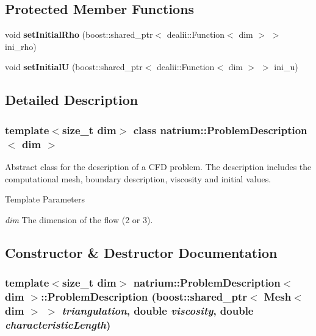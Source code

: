 \subsection*{Protected Member Functions}
\begin{DoxyCompactItemize}
\item 
\hypertarget{classnatrium_1_1ProblemDescription_a3b1f71cc4ec46691a29478049d851c8d}{
void {\bfseries setInitialRho} (boost::shared\_\-ptr$<$ dealii::Function$<$ dim $>$ $>$ ini\_\-rho)}
\label{classnatrium_1_1ProblemDescription_a3b1f71cc4ec46691a29478049d851c8d}

\item 
\hypertarget{classnatrium_1_1ProblemDescription_a1e173a98aaf7233b9b9e849b5d1f9efb}{
void {\bfseries setInitialU} (boost::shared\_\-ptr$<$ dealii::Function$<$ dim $>$ $>$ ini\_\-u)}
\label{classnatrium_1_1ProblemDescription_a1e173a98aaf7233b9b9e849b5d1f9efb}

\end{DoxyCompactItemize}


\subsection{Detailed Description}
\subsubsection*{template$<$size\_\-t dim$>$ class natrium::ProblemDescription$<$ dim $>$}

Abstract class for the description of a CFD problem. The description includes the computational mesh, boundary description, viscosity and initial values. 
\begin{DoxyTemplParams}{Template Parameters}
\item[{\em dim}]The dimension of the flow (2 or 3). \end{DoxyTemplParams}


\subsection{Constructor \& Destructor Documentation}
\hypertarget{classnatrium_1_1ProblemDescription_afc92659d0022799b4e846cf050e8efad}{
\subsubsection[{ProblemDescription}]{\setlength{\rightskip}{0pt plus 5cm}template$<$size\_\-t dim$>$ {\bf natrium::ProblemDescription}$<$ dim $>$::{\bf ProblemDescription} (boost::shared\_\-ptr$<$ Mesh$<$ dim $>$ $>$ {\em triangulation}, \/  double {\em viscosity}, \/  double {\em characteristicLength})}}
\label{classnatrium_1_1ProblemDescription_afc92659d0022799b4e846cf050e8efad}


